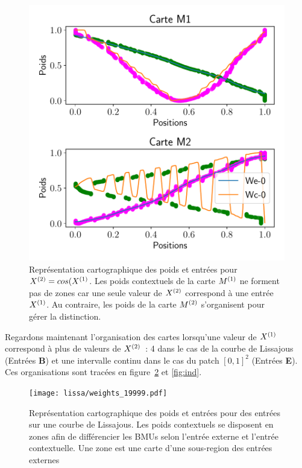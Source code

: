 \documentclass[../main]{subfiles}
\begin{document}
	\begin{figure}
		\centering\includegraphics[width=\textwidth]{2som_cos_w.pdf}
		\caption{Représentation cartographique des poids et entrées pour $X^{({2})} = cos(X^{({1})}$. Les poids contextuels de la carte $M^{({1})}$ ne forment pas de zones car une seule valeur de $X^{({2})}$ correspond à une entrée $X^{({1})}$. Au contraire, les poids de la carte $M^{({2})}$ s'organisent pour gérer la distinction. \label{fig:cos_results}}
	\end{figure}

Regardons maintenant l'organisation des cartes lorsqu'une valeur de $X^{({1})}$ correspond à plus de valeurs de $X^{({2})}$~: 4 dans le cas de la courbe de Lissajous (Entrées \textbf{B}) et une intervalle continu dans le cas du patch $[0,1]^2$ (Entrées \textbf{E}). Ces organisations sont tracées en figure~\ref{fig:lissa} et \ref{fig:ind}.

\begin{figure}
	\centering\texttt{[image: lissa/weights\_19999.pdf]}
	\caption{Représentation cartographique des poids et entrées pour des entrées sur une courbe de Lissajous. Les poids contextuels se disposent en zones afin de différencier les BMUs selon l'entrée externe et l'entrée contextuelle. Une zone est une carte d'une sous-region des entrées externes \label{fig:lissa}}
\end{figure}
\end{document}
